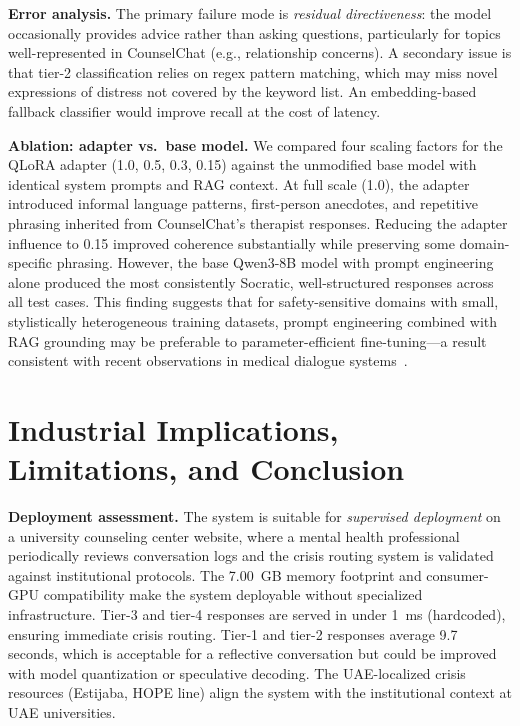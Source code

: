 \documentclass[conference]{IEEEtran}
\begin{document}
\textbf{Error analysis.} The primary failure mode is \textit{residual directiveness}: the model occasionally provides advice rather than asking questions, particularly for topics well-represented in CounselChat (e.g., relationship concerns). A secondary issue is that tier-2 classification relies on regex pattern matching, which may miss novel expressions of distress not covered by the keyword list. An embedding-based fallback classifier would improve recall at the cost of latency.

\textbf{Ablation: adapter vs.\ base model.} We compared four scaling factors for the QLoRA adapter (1.0, 0.5, 0.3, 0.15) against the unmodified base model with identical system prompts and RAG context. At full scale (1.0), the adapter introduced informal language patterns, first-person anecdotes, and repetitive phrasing inherited from CounselChat's therapist responses. Reducing the adapter influence to 0.15 improved coherence substantially while preserving some domain-specific phrasing. However, the base Qwen3-8B model with prompt engineering alone produced the most consistently Socratic, well-structured responses across all test cases. This finding suggests that for safety-sensitive domains with small, stylistically heterogeneous training datasets, prompt engineering combined with RAG grounding may be preferable to parameter-efficient fine-tuning---a result consistent with recent observations in medical dialogue systems~\cite{xiong2024benchmarking}.

\section{Industrial Implications, Limitations, and Conclusion}

\textbf{Deployment assessment.} The system is suitable for \textit{supervised deployment} on a university counseling center website, where a mental health professional periodically reviews conversation logs and the crisis routing system is validated against institutional protocols. The 7.00~GB memory footprint and consumer-GPU compatibility make the system deployable without specialized infrastructure. Tier-3 and tier-4 responses are served in under 1~ms (hardcoded), ensuring immediate crisis routing. Tier-1 and tier-2 responses average 9.7 seconds, which is acceptable for a reflective conversation but could be improved with model quantization or speculative decoding. The UAE-localized crisis resources (Estijaba, HOPE line) align the system with the institutional context at UAE universities.
\end{document}
